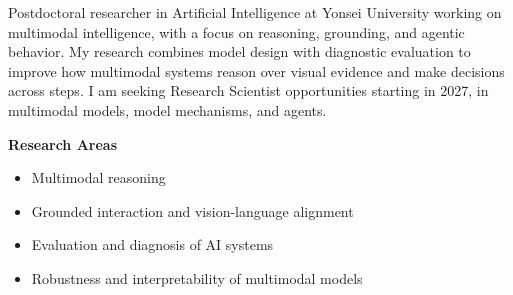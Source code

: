 Postdoctoral researcher in Artificial Intelligence at Yonsei University working on multimodal intelligence, with a focus on reasoning, grounding, and agentic behavior. My research combines model design with diagnostic evaluation to improve how multimodal systems reason over visual evidence and make decisions across steps. I am seeking Research Scientist opportunities starting in 2027, in multimodal models, model mechanisms, and agents.

\vspace{0.5em}
\textbf{Research Areas}
\begin{itemize}
    \item Multimodal reasoning
    \item Grounded interaction and vision-language alignment
    \item Evaluation and diagnosis of AI systems
    \item Robustness and interpretability of multimodal models
\end{itemize}
